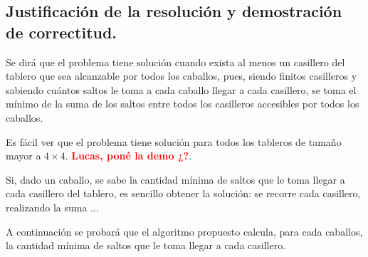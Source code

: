 %
%



\newpage
\subsection{Justificación de la resolución y demostración de correctitud.}

\vspace*{0.3cm}

Se dirá que el problema tiene solución cuando exista al menos un casillero del
tablero que sea alcanzable por todos los caballos, pues, siendo finitos
casilleros y sabiendo cuántos saltos le toma a cada caballo llegar a cada
casillero, se toma el mínimo de la suma de los saltos entre todos los casilleros
accesibles por todos los caballos.

Es fácil ver que el problema tiene solución para todos los tableros de tamaño
mayor a $4 \times 4$. \textcolor{red}{\textbf{Lucas, poné la demo ¿?}}.

Si, dado un caballo, se sabe la cantidad mínima de saltos que le toma llegar a
cada casillero del tablero, es sencillo obtener la solución: se recorre cada
casillero, realizando la suma ...

A continuación se probará que el algoritmo propuesto calcula, para cada caballos,
la cantidad mínima de saltos que le toma llegar a cada casillero.



